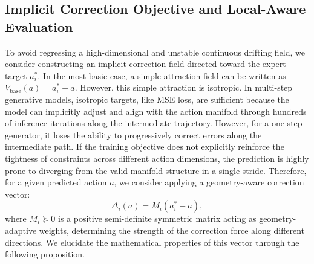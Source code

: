 \subsection{Implicit Correction Objective and Local-Aware Evaluation}
\label{sec:4.1}
To avoid regressing a high-dimensional and unstable continuous drifting field, 
we consider constructing an implicit correction field directed toward the expert target \(a_i^*\). 
In the most basic case, a simple attraction field can be written as \(V_{\mathrm{base}}(a) = a_i^* - a\). 
However, this simple attraction is isotropic. In multi-step generative models, 
isotropic targets, like MSE loss, are sufficient because the model can implicitly adjust and align with the action manifold through hundreds of inference iterations along the intermediate trajectory. 
However, for a one-step generator, it loses the ability to progressively correct errors along the intermediate path. 
If the training objective does not explicitly reinforce the tightness of constraints across different action dimensions, 
the prediction is highly prone to diverging from the valid manifold structure in a single stride.
Therefore, for a given predicted action \(a\), we consider applying a geometry-aware correction vector:
\begin{equation}
    \Delta_i(a) = M_i(a_i^* - a),
\end{equation}
where \(M_i \succeq 0\) is a positive semi-definite symmetric matrix acting as geometry-adaptive weights, 
determining the strength of the correction force along different directions. 
We elucidate the mathematical properties of this vector through the following proposition.

